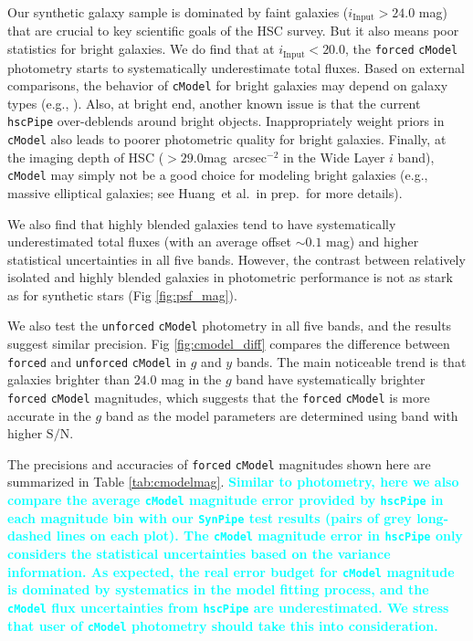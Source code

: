 \documentclass[useamsfonts]{pasj01}
\def\sb{mag~arcsec$^{-2}$}
\def\etal{{\ et al.~}}
\def\hscpipe{\texttt{hscPipe}}
\def\synpipe{\texttt{SynPipe}}
\def\cmodel{\texttt{cModel}}
\def\forced{\texttt{forced}}
\def\unforced{\texttt{unforced}}
\def\s2n{{$\mathrm{S}/\mathrm{N}$}}
\newcommand{\song}[1]{\textcolor{cyan} {\textbf{#1}}}
\begin{document}
    Our synthetic galaxy sample is dominated by faint galaxies 
    ($i_{\mathrm{Input}} > 24.0$ mag) that are crucial to key scientific goals of the 
    HSC survey.
    But it also means poor statistics for bright galaxies. 
    We do find that at $i_{\mathrm{Input}}<20.0$, the \forced{} \cmodel{} photometry 
    starts to systematically underestimate total fluxes. 
    Based on external comparisons, the behavior of \cmodel{} for bright galaxies may 
    depend on galaxy types (e.g., \citealt{HSCDR1}).  
    Also, at bright end, another known issue is that the current \hscpipe{}
    over-deblends around bright objects. 
    Inappropriately weight priors in \cmodel{} also leads to poorer photometric 
    quality for bright galaxies.  
    Finally, at the imaging depth of HSC ($>29.0$\sb{} in the Wide Layer $i$ band),  
    \cmodel{} may simply not be a good choice for modeling bright galaxies 
    (e.g., massive elliptical galaxies; see Huang\etal in prep.~for more details).

    We also find that highly blended galaxies tend to have systematically 
    underestimated total fluxes (with an average offset ${\sim}0.1$ mag) and 
    higher statistical uncertainties in all five bands. 
    However, the contrast between relatively isolated and highly blended galaxies
    in photometric performance is not as stark as for synthetic stars 
    (Fig \ref{fig:psf_mag}).

    We also test the \unforced{} \cmodel{} photometry in all five bands, and the
    results suggest similar precision.
    Fig \ref{fig:cmodel_diff} compares the difference between \forced{} and \unforced{} 
    \cmodel{} in $g$ and $y$ bands.  
    The main noticeable trend is that galaxies brighter than $24.0$ mag in the $g$ band 
    have systematically brighter \forced{} \cmodel{} magnitudes, which suggests that 
    the \forced{} \cmodel{} is more accurate in the $g$ band as the model parameters 
    are determined using band with higher \s2n{}.
    
	The precisions and accuracies of \forced{} \cmodel{} magnitudes shown here are 
	summarized in Table \ref{tab:cmodelmag}. 
	\song{
	Similar to \psf{} photometry, here we also compare the average \cmodel{} magnitude 
	error provided by \hscpipe{} in each magnitude bin with our \synpipe{} test results
	(pairs of grey long-dashed lines on each plot). 
	The \cmodel{} magnitude error in \hscpipe{} only considers the statistical 
	uncertainties based on the variance information. 
	As expected, the real error budget for \cmodel{} magnitude is dominated by 
	systematics in the model fitting process, and the \cmodel{} flux uncertainties 
	from \hscpipe{} are underestimated. 
	We stress that user of \cmodel{} photometry should take this into consideration.
	}
\end{document}
